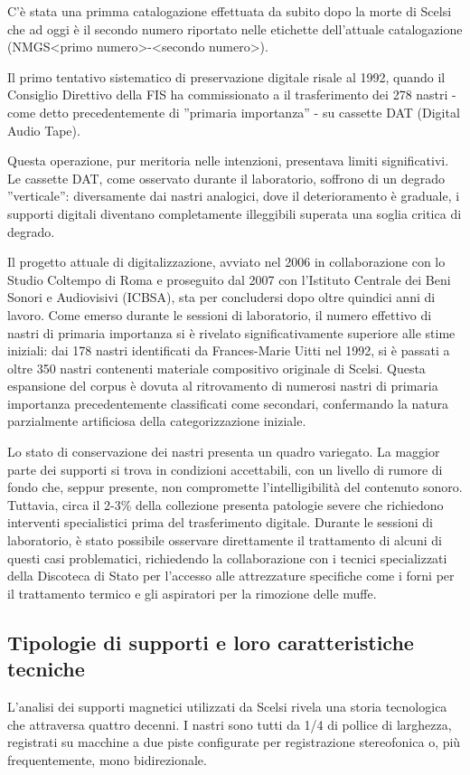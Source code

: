 C'è stata una primma catalogazione effettuata da  subito dopo la morte di Scelsi che ad oggi è il secondo numero riportato nelle etichette dell'attuale catalogazione (NMGS<primo numero>-<secondo numero>).

Il primo tentativo sistematico di preservazione digitale risale al 1992, quando il Consiglio Direttivo della FIS ha commissionato a  il trasferimento dei 278 nastri - come detto precedentemente di ''primaria importanza'' - su cassette DAT (Digital Audio Tape). 

Questa operazione, pur meritoria nelle intenzioni, presentava limiti significativi. Le cassette DAT, come osservato durante il laboratorio, soffrono di un degrado ''verticale'': diversamente dai nastri analogici, dove il deterioramento è graduale, i supporti digitali diventano completamente illeggibili superata una soglia critica di degrado.

Il progetto attuale di digitalizzazione, avviato nel 2006 in collaborazione con lo Studio Coltempo di Roma e proseguito dal 2007 con l'Istituto Centrale dei Beni Sonori e Audiovisivi (ICBSA)\cite{pro:beracpmm4ch2011}, sta per concludersi dopo oltre quindici anni di lavoro. Come emerso durante le sessioni di laboratorio, il numero effettivo di nastri di primaria importanza si è rivelato significativamente superiore alle stime iniziali: dai 178 nastri identificati da Frances-Marie Uitti nel 1992, si è passati a oltre 350 nastri contenenti materiale compositivo originale di Scelsi. Questa espansione del corpus è dovuta al ritrovamento di numerosi nastri di primaria importanza precedentemente classificati come secondari, confermando la natura parzialmente artificiosa della categorizzazione iniziale.

Lo stato di conservazione dei nastri presenta un quadro variegato. La maggior parte dei supporti si trova in condizioni accettabili, con un livello di rumore di fondo che, seppur presente, non compromette l'intelligibilità del contenuto sonoro. Tuttavia, circa il 2-3\% della collezione presenta patologie severe che richiedono interventi specialistici prima del trasferimento digitale.  Durante le sessioni di laboratorio, è stato possibile osservare direttamente il trattamento di alcuni di questi casi problematici, richiedendo la collaborazione con i tecnici specializzati della Discoteca di Stato per l'accesso alle attrezzature specifiche come i forni per il trattamento termico e gli aspiratori per la rimozione delle muffe.
\subsection{Tipologie di supporti e loro caratteristiche tecniche}
L'analisi dei supporti magnetici utilizzati da Scelsi rivela una storia tecnologica che attraversa quattro decenni. I nastri sono tutti da 1/4 di pollice di larghezza, registrati su macchine a due piste configurate per registrazione stereofonica o, più frequentemente, mono bidirezionale.

